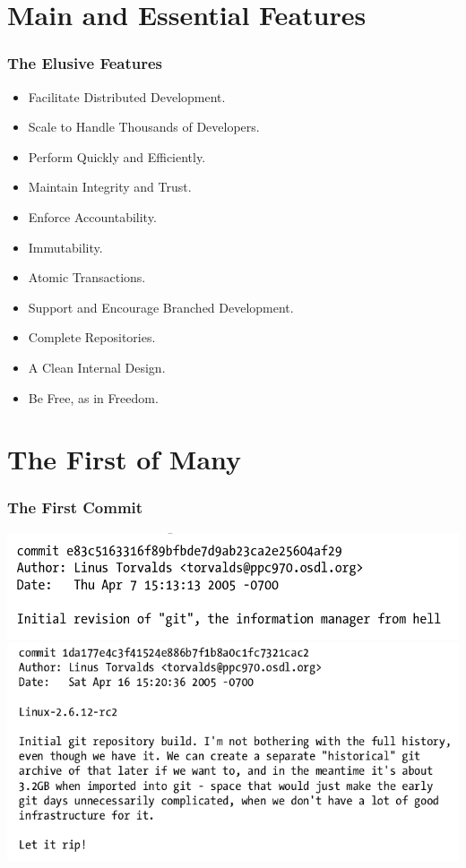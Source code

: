 \documentclass[22pt]{beamer}
\begin{document}
\section{Main and Essential Features}
\begin{frame}
    \frametitle{The Elusive Features}
    \begin{itemize}
        \item Facilitate Distributed Development.
              \pause
        \item Scale to Handle Thousands of Developers.
              \pause
        \item Perform Quickly and Efficiently.
              \pause
        \item Maintain Integrity and Trust.
              \pause
        \item Enforce Accountability.
              \pause
        \item Immutability.
              \pause
        \item Atomic Transactions.
              \pause
        \item Support and Encourage Branched Development.
              \pause
        \item Complete Repositories.
              \pause
        \item A Clean Internal Design.
              \pause
        \item Be Free, as in Freedom.
    \end{itemize}



\end{frame}

\section{The First of Many}

\begin{frame}[allowframebreaks]
    \frametitle{The First Commit}

    \includegraphics[width=\linewidth]{images/Screenshot from 2020-12-10 13-43-08.png}
    \includegraphics[width=\linewidth]{images/Screenshot from 2020-12-10 13-35-57.png}


\end{frame}
\end{document}
